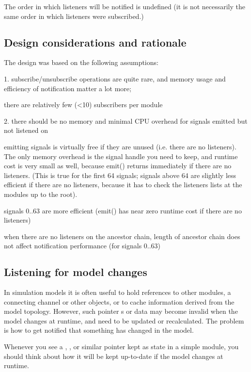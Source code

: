 \begin{note}
\begin{note}
The order in which listeners will be notified is undefined (it is not necessarily
the same order in which listeners were subscribed.)


\subsection{Design considerations and rationale}

The design was based on the following assumptions:

1. subscribe/unsubscribe operations are quite rare,
and memory usage and efficiency of notification matter a lot more;

there are relatively few (<10) subscribers per module

2. there should be no memory and minimal CPU overhead for signals emitted but not listened on

emitting signals is virtually free if they are unused (i.e. there are
no listeners). The only memory overhead is the signal handle you need
to keep, and runtime cost is very small as well, because emit()
returns immediately if there are no listeners. (This is true for the
first 64 signals; signals above 64 are slightly less efficient if there
are no listeners, because it has to check the listeners lists at
the modules up to the root).

signals 0..63 are more efficient (emit() has near zero runtime cost if there
are no listeners)

when there are no listeners on the ancestor chain, length of ancestor chain
does not affect notification performance (for signals 0..63)


\subsection{Listening for model changes}
\label{sec:ch-simple-modules:model-change}

In simulation models it is often useful to hold references to other
modules, a connecting channel or other objects, or to cache information
derived from the model topology. However, such pointer s or data may
become invalid when the model changes at runtime, and need to be updated
or recalculated. The problem is how to get notified that something has
changed in the model.

\begin{note}
  Whenever you see a , ,  or
  similar pointer kept as state in a simple module, you should think about
  how it will be kept up-to-date if the model changes at runtime.
\end{note}


\end{note}
\end{note}
